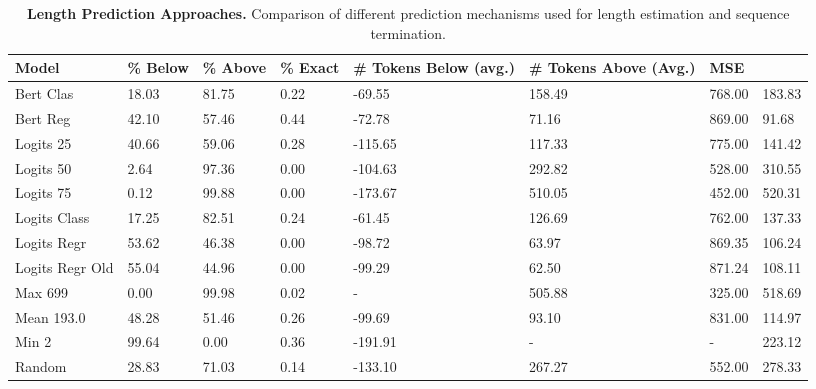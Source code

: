 \begin{table*}[htbp]
\centering
\caption{\textbf{Length Prediction Approaches.} Comparison of different prediction mechanisms used for length estimation and sequence termination.}
\label{tab:model_performance}
\begin{tabularx}{\linewidth}{l|YYYYYYY}
\toprule
\textbf{Model} & \textbf{\% Below} & \textbf{\% Above} & \textbf{\% Exact} & \textbf{\# Tokens Below (avg.)} & \textbf{\# Tokens Above (Avg.)} & \textbf{MSE} \\ \midrule
Bert Clas & 18.03 & 81.75 & 0.22 & -69.55 & 158.49 & 768.00 & 183.83 \\
Bert Reg & 42.10 & 57.46 & 0.44 & -72.78 & 71.16 & 869.00 & 91.68 \\
Logits 25 & 40.66 & 59.06 & 0.28 & -115.65 & 117.33 & 775.00 & 141.42 \\
Logits 50 & 2.64 & 97.36 & 0.00 & -104.63 & 292.82 & 528.00 & 310.55 \\
Logits 75 & 0.12 & 99.88 & 0.00 & -173.67 & 510.05 & 452.00 & 520.31 \\
Logits Class & 17.25 & 82.51 & 0.24 & -61.45 & 126.69 & 762.00 & 137.33 \\
Logits Regr & 53.62 & 46.38 & 0.00 & -98.72 & 63.97 & 869.35 & 106.24 \\
Logits Regr Old & 55.04 & 44.96 & 0.00 & -99.29 & 62.50 & 871.24 & 108.11 \\
Max 699 & 0.00 & 99.98 & 0.02 & - & 505.88 & 325.00 & 518.69 \\
Mean 193.0 & 48.28 & 51.46 & 0.26 & -99.69 & 93.10 & 831.00 & 114.97 \\
Min 2 & 99.64 & 0.00 & 0.36 & -191.91 & - & - & 223.12 \\
Random & 28.83 & 71.03 & 0.14 & -133.10 & 267.27 & 552.00 & 278.33 \\
\bottomrule
\end{tabularx}
\end{table*}